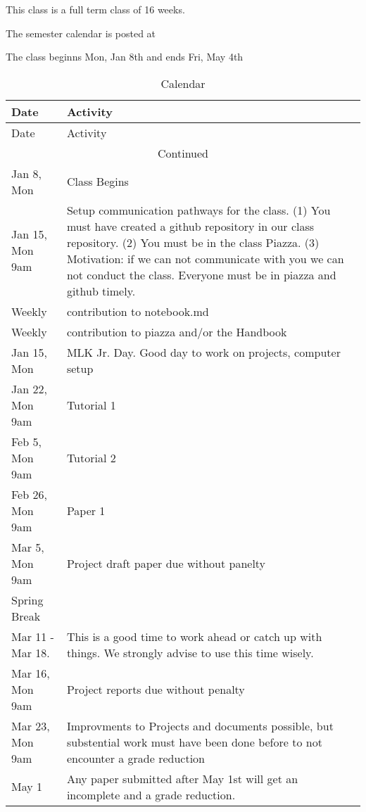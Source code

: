 This class is a full term class of 16 weeks.

\begin{IU}

The semester calendar is posted at 


The class beginns Mon, Jan 8th and ends Fri, May 4th

\end{IU}

\begin{longtable}{p{3cm}p{11cm}}
  \caption{Calendar} \\   
  \toprule
  Date & Activity \\
  \midrule
  \endfirsthead
  \toprule
  Date & Activity \\
  \endhead
  \hline
  \multicolumn{2}{c}{Continued}\\   \bottomrule
  \endfoot
  \bottomrule
  \endlastfoot

  Jan 8, Mon & Class Begins\\
  
  Jan 15, Mon 9am & Setup communication pathways for the class. (1)
  You must have created a github repository in our class repository.
  (2) You must be in the class Piazza.  (3) Motivation: if we can not
  communicate with you we can not conduct the class. Everyone must be
  in piazza and github timely.  \\

  Weekly & contribution to notebook.md \\
  Weekly & contribution to piazza and/or the Handbook \\

  Jan 15, Mon & MLK Jr. Day. Good day to work on projects, computer setup \\
  Jan 22, Mon 9am & Tutorial 1 \\
  Feb 5,  Mon 9am & Tutorial 2 \\
  Feb 26, Mon 9am & Paper 1 \\
  Mar 5, Mon 9am & Project draft paper due without panelty \\
  \hline
  Spring Break &\\
  Mar 11 - Mar 18.  & This is a good time to work ahead or catch up
  with things. We strongly advise to use this time wisely. \\
  \hline
  Mar 16, Mon 9am & Project reports due without penalty \\
  Mar 23, Mon 9am & Improvments to Projects and documents possible,
  but substential work must have been done before to not encounter a
  grade reduction \\
  May 1 & Any paper submitted after May 1st will get an
  incomplete and a grade reduction. \\
\end{longtable}

